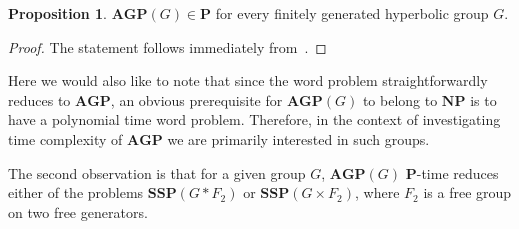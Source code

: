 \documentclass[10pt]{amsart}
\theoremstyle{definition}
\newtheorem{proposition}[theorem]{Proposition}
\def\P{{\mathbf{P}}}
\def\NP{{\mathbf{NP}}}
\def\SSP{{\mathbf{SSP}}}
\def\AGP{{\mathbf{AGP}}}
\begin{document}
\begin{proposition}\label{pr:agp_hyp}
$\AGP(G)\in\P$ for every finitely generated hyperbolic group $G$.
\end{proposition}
\begin{proof}
The statement follows immediately from~\cite[Proposition 5.5]{MNU1}.
\end{proof}
Here we would also like to note that since the word problem straightforwardly reduces to $\AGP$, an obvious prerequisite for $\AGP(G)$ to belong to $\NP$ is to have a polynomial time word problem. Therefore, in the context of investigating time complexity of $\AGP$ we are primarily interested in such groups.


The second observation is that for a given group $G$, $\AGP(G)$ $\P$-time reduces either of the problems $\SSP(G\ast F_2)$ or $\SSP(G\times F_2)$, where $F_2$ is a free group on two free generators.
\end{document}
